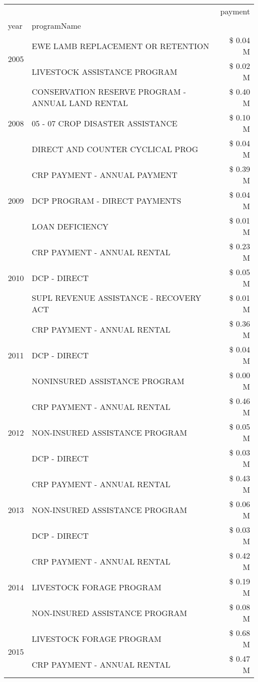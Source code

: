 \begin{tabular}{llr}
\toprule
 &  & payment \\
year & programName &  \\
\midrule
\multirow[t]{2}{*}{2005} & EWE LAMB REPLACEMENT OR RETENTION & \$ 0.04 M \\
 & LIVESTOCK ASSISTANCE PROGRAM & \$ 0.02 M \\
\cline{1-3}
\multirow[t]{3}{*}{2008} & CONSERVATION RESERVE PROGRAM - ANNUAL LAND RENTAL & \$ 0.40 M \\
 & 05 - 07 CROP DISASTER ASSISTANCE & \$ 0.10 M \\
 & DIRECT AND COUNTER CYCLICAL PROG & \$ 0.04 M \\
\cline{1-3}
\multirow[t]{3}{*}{2009} & CRP PAYMENT - ANNUAL PAYMENT & \$ 0.39 M \\
 & DCP PROGRAM - DIRECT PAYMENTS & \$ 0.04 M \\
 & LOAN DEFICIENCY & \$ 0.01 M \\
\cline{1-3}
\multirow[t]{3}{*}{2010} & CRP PAYMENT - ANNUAL RENTAL & \$ 0.23 M \\
 & DCP - DIRECT & \$ 0.05 M \\
 & SUPL REVENUE ASSISTANCE - RECOVERY ACT & \$ 0.01 M \\
\cline{1-3}
\multirow[t]{3}{*}{2011} & CRP PAYMENT - ANNUAL RENTAL & \$ 0.36 M \\
 & DCP - DIRECT & \$ 0.04 M \\
 & NONINSURED ASSISTANCE PROGRAM & \$ 0.00 M \\
\cline{1-3}
\multirow[t]{3}{*}{2012} & CRP PAYMENT - ANNUAL RENTAL & \$ 0.46 M \\
 & NON-INSURED ASSISTANCE PROGRAM & \$ 0.05 M \\
 & DCP - DIRECT & \$ 0.03 M \\
\cline{1-3}
\multirow[t]{3}{*}{2013} & CRP PAYMENT - ANNUAL RENTAL & \$ 0.43 M \\
 & NON-INSURED ASSISTANCE PROGRAM & \$ 0.06 M \\
 & DCP - DIRECT & \$ 0.03 M \\
\cline{1-3}
\multirow[t]{3}{*}{2014} & CRP PAYMENT - ANNUAL RENTAL & \$ 0.42 M \\
 & LIVESTOCK FORAGE PROGRAM & \$ 0.19 M \\
 & NON-INSURED ASSISTANCE PROGRAM & \$ 0.08 M \\
\cline{1-3}
\multirow[t]{3}{*}{2015} & LIVESTOCK FORAGE PROGRAM & \$ 0.68 M \\
 & CRP PAYMENT - ANNUAL RENTAL & \$ 0.47 M \\

\end{tabular}
